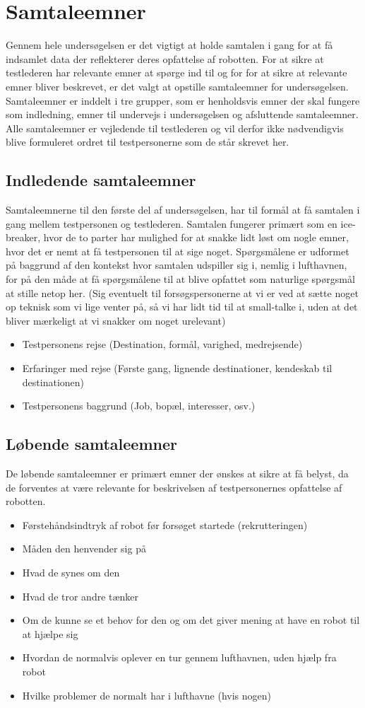 \section{Samtaleemner}
\label{ParametreSamtaleemner}
%
Gennem hele undersøgelsen er det vigtigt at holde samtalen i gang for at få indsamlet data der reflekterer deres opfattelse af robotten. For at sikre at testlederen har relevante emner at spørge ind til og for for at sikre at relevante emner bliver beskrevet, er det valgt at opstille samtaleemner for undersøgelsen. Samtaleemner er inddelt i tre grupper, som er henholdsvis emner der skal fungere som indledning, emner til undervejs i undersøgelsen og afsluttende samtaleemner. Alle samtaleemner er vejledende til testlederen og vil derfor ikke nødvendigvis blive formuleret ordret til testpersonerne som de står skrevet her.
%
\subsection{Indledende samtaleemner} 
%
Samtaleemnerne til den første del af undersøgelsen, har til formål at få samtalen i gang mellem testpersonen og testlederen. Samtalen fungerer primært som en ice-breaker, hvor de to parter har mulighed for at snakke lidt løst om nogle emner, hvor det er nemt at få testpersonen til at sige noget. Spørgsmålene er udformet på baggrund af den kontekst hvor samtalen udspiller sig i, nemlig i lufthavnen, for på den måde at få spørgsmålene til at blive opfattet som naturlige spørgsmål at stille netop her. 
(Sig eventuelt til forsøgspersonerne at vi er ved at sætte noget op teknisk som vi lige venter på, så vi har lidt tid til at small-talke i, uden at det bliver mærkeligt at vi snakker om noget urelevant)
%
\begin{itemize}
\item Testpersonens rejse (Destination, formål, varighed, medrejsende)
\item Erfaringer med rejse (Første gang, lignende destinationer, kendeskab til destinationen) 
\item Testpersonens baggrund (Job, bopæl, interesser, osv.)
\end{itemize}
%
\subsection{Løbende samtaleemner} 
De løbende samtaleemner er primært emner der ønskes at sikre at få belyst, da de forventes at være relevante for beskrivelsen af testpersonernes opfattelse af robotten. 
%
\begin{itemize}
\item Førstehåndsindtryk af robot før forsøget startede (rekrutteringen)
\item Måden den henvender sig på
\item Hvad de synes om den
\item Hvad de tror andre tænker 
\item Om de kunne se et behov for den og om det giver mening at have en robot til at hjælpe sig
\item Hvordan de normalvis oplever en tur gennem lufthavnen, uden hjælp fra robot
\item Hvilke problemer de normalt har i lufthavne (hvis nogen) 
\end{itemize}
%
